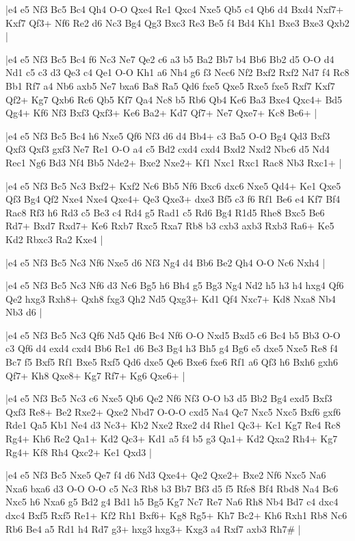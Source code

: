 \whitename{}
\blackname{}
\makegametitle
|e4 e5 Nf3 Bc5 Bc4 Qh4 O-O Qxe4 Re1 Qxc4 Nxe5 Qb5 c4 Qb6 d4 Bxd4 Nxf7+ Kxf7 Qf3+ Nf6 Re2 d6 Nc3 Bg4 Qg3 Bxc3 Re3 Be5 f4 Bd4 Kh1 Bxe3 Bxe3 Qxb2  |

\whitename{}
\blackname{}
\makegametitle
|e4 e5 Nf3 Bc5 Bc4 f6 Nc3 Ne7 Qe2 c6 a3 b5 Ba2 Bb7 b4 Bb6 Bb2 d5 O-O d4 Nd1 c5 c3 d3 Qe3 c4 Qe1 O-O Kh1 a6 Nh4 g6 f3 Nec6 Nf2 Bxf2 Rxf2 Nd7 f4 Rc8 Bb1 Rf7 a4 Nb6 axb5 Ne7 bxa6 Ba8 Ra5 Qd6 fxe5 Qxe5 Rxe5 fxe5 Rxf7 Kxf7 Qf2+ Kg7 Qxb6 Rc6 Qb5 Kf7 Qa4 Nc8 b5 Rb6 Qb4 Ke6 Ba3 Bxe4 Qxc4+ Bd5 Qg4+ Kf6 Nf3 Bxf3 Qxf3+ Ke6 Ba2+ Kd7 Qf7+ Ne7 Qxe7+ Kc8 Be6+  |

\whitename{}
\blackname{}
\makegametitle
|e4 e5 Nf3 Bc5 Bc4 h6 Nxe5 Qf6 Nf3 d6 d4 Bb4+ c3 Ba5 O-O Bg4 Qd3 Bxf3 Qxf3 Qxf3 gxf3 Ne7 Re1 O-O a4 c5 Bd2 cxd4 cxd4 Bxd2 Nxd2 Nbc6 d5 Nd4 Rec1 Ng6 Bd3 Nf4 Bb5 Nde2+ Bxe2 Nxe2+ Kf1 Nxc1 Rxc1 Rac8 Nb3 Rxc1+  |

\whitename{}
\blackname{}
\makegametitle
|e4 e5 Nf3 Bc5 Nc3 Bxf2+ Kxf2 Nc6 Bb5 Nf6 Bxc6 dxc6 Nxe5 Qd4+ Ke1 Qxe5 Qf3 Bg4 Qf2 Nxe4 Nxe4 Qxe4+ Qe3 Qxe3+ dxe3 Bf5 c3 f6 Rf1 Be6 e4 Kf7 Bf4 Rac8 Rf3 h6 Rd3 c5 Be3 c4 Rd4 g5 Rad1 c5 Rd6 Bg4 R1d5 Rhe8 Bxc5 Be6 Rd7+ Bxd7 Rxd7+ Ke6 Rxb7 Rxc5 Rxa7 Rb8 b3 cxb3 axb3 Rxb3 Ra6+ Ke5 Kd2 Rbxc3 Ra2 Kxe4  |

\whitename{}
\blackname{}
\makegametitle
|e4 e5 Nf3 Bc5 Nc3 Nf6 Nxe5 d6 Nf3 Ng4 d4 Bb6 Be2 Qh4 O-O Nc6 Nxh4  |

\whitename{}
\blackname{}
\makegametitle
|e4 e5 Nf3 Bc5 Nc3 Nf6 d3 Nc6 Bg5 h6 Bh4 g5 Bg3 Ng4 Nd2 h5 h3 h4 hxg4 Qf6 Qe2 hxg3 Rxh8+ Qxh8 fxg3 Qh2 Nd5 Qxg3+ Kd1 Qf4 Nxc7+ Kd8 Nxa8 Nb4 Nb3 d6  |

\whitename{}
\blackname{}
\makegametitle
|e4 e5 Nf3 Bc5 Nc3 Qf6 Nd5 Qd6 Bc4 Nf6 O-O Nxd5 Bxd5 c6 Bc4 b5 Bb3 O-O c3 Qf6 d4 exd4 cxd4 Bb6 Re1 d6 Be3 Bg4 h3 Bh5 g4 Bg6 e5 dxe5 Nxe5 Re8 f4 Bc7 f5 Bxf5 Rf1 Bxe5 Rxf5 Qd6 dxe5 Qe6 Bxe6 fxe6 Rf1 a6 Qf3 h6 Bxh6 gxh6 Qf7+ Kh8 Qxe8+ Kg7 Rf7+ Kg6 Qxe6+  |

\whitename{}
\blackname{}
\makegametitle
|e4 e5 Nf3 Bc5 Nc3 c6 Nxe5 Qb6 Qe2 Nf6 Nf3 O-O b3 d5 Bb2 Bg4 exd5 Bxf3 Qxf3 Re8+ Be2 Rxe2+ Qxe2 Nbd7 O-O-O cxd5 Na4 Qc7 Nxc5 Nxc5 Bxf6 gxf6 Rde1 Qa5 Kb1 Ne4 d3 Nc3+ Kb2 Nxe2 Rxe2 d4 Rhe1 Qc3+ Kc1 Kg7 Re4 Rc8 Rg4+ Kh6 Re2 Qa1+ Kd2 Qc3+ Kd1 a5 f4 b5 g3 Qa1+ Kd2 Qxa2 Rh4+ Kg7 Rg4+ Kf8 Rh4 Qxc2+ Ke1 Qxd3  |

\whitename{}
\blackname{}
\makegametitle
|e4 e5 Nf3 Bc5 Nxe5 Qe7 f4 d6 Nd3 Qxe4+ Qe2 Qxe2+ Bxe2 Nf6 Nxc5 Na6 Nxa6 bxa6 d3 O-O O-O c5 Nc3 Rb8 b3 Bb7 Bf3 d5 f5 Rfe8 Bf4 Rbd8 Na4 Bc6 Nxc5 h6 Nxa6 g5 Bd2 g4 Bd1 h5 Bg5 Kg7 Nc7 Re7 Na6 Rh8 Nb4 Bd7 c4 dxc4 dxc4 Bxf5 Rxf5 Re1+ Kf2 Rh1 Bxf6+ Kg8 Rg5+ Kh7 Bc2+ Kh6 Rxh1 Rb8 Nc6 Rb6 Be4 a5 Rd1 h4 Rd7 g3+ hxg3 hxg3+ Kxg3 a4 Rxf7 axb3 Rh7\#  |

